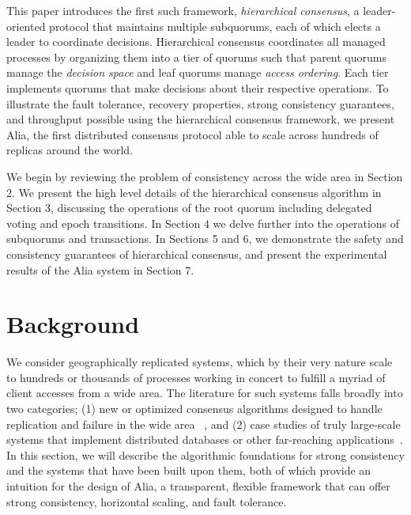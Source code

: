 \documentclass[sigplan,screen,review,anonymous,nonacm]{acmart}
\begin{document}
This paper introduces the first such framework, \emph{hierarchical consensus}, a 
leader-oriented protocol that maintains multiple subquorums, each of which elects a leader 
to coordinate decisions. 
Hierarchical consensus coordinates all managed processes by organizing them into a tier
of quorums such that parent quorums manage the \emph{decision space} and leaf quorums
manage \emph{access ordering}.
Each tier implements quorums that make decisions about their respective operations.
To illustrate the fault tolerance, recovery properties, strong consistency guarantees, 
and throughput possible using the hierarchical consensus framework, we present Alia, the 
first distributed consensus protocol able to scale across hundreds of replicas around the 
world.

We begin by reviewing the problem of consistency across the wide area in Section 2. 
We present the high level details of the hierarchical consensus algorithm in Section 3, 
discussing the operations of the root quorum including delegated voting and epoch 
transitions.
In Section 4 we delve further into the operations of subquorums and transactions. 
In Sections 5 and 6, we demonstrate the safety and consistency guarantees of hierarchical 
consensus, and present the experimental results of the Alia system in Section 7.

\section{Background}

We consider geographically replicated systems, which by their very nature scale to 
hundreds or thousands of processes working in concert to fulfill a myriad of client 
accesses from a wide area. 
The literature for such systems falls broadly into two categories; (1) new or optimized 
consensus algorithms designed to handle replication and failure in the wide area 
~\cite{epaxos, spaxos}, and (2) case studies of truly large-scale systems that implement 
distributed databases or other far-reaching applications~\cite{calvinfs,spanner,scatter}.
In this section, we will describe the algorithmic foundations for strong consistency 
and the systems that have been built upon them, both of which provide an intuition for
the design of Alia, a transparent, flexible framework that can offer strong 
consistency, horizontal scaling, and fault tolerance.
\end{document}
